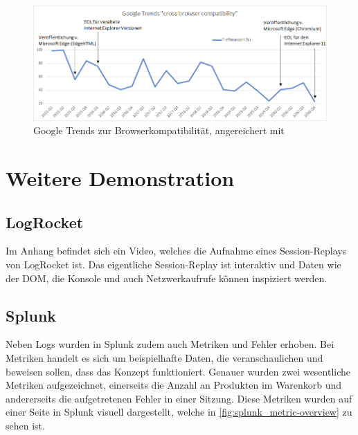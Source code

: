 \begin{figure}[H]
	\centering
	\includegraphics[width=0.84\linewidth]{img/99_postscript/google-trends_cross-browser-compatability.png}
	\caption{Google Trends zur Browserkompatibilität, angereichert mit \cite{MicrosoftIEandEdgeLifecycleFAQ}}
	\label{fig:google-search-trends_cross-browser-compatability}
\end{figure}

\section{Weitere Demonstration}
\label{sec:weitere-demonstration}

\subsection{LogRocket}
\label{sec:demo-logrocket}

Im Anhang befindet sich ein Video, welches die Aufnahme eines Session-Replays von LogRocket ist. Das eigentliche Session-Replay ist interaktiv und Daten wie der DOM, die Konsole und auch Netzwerkaufrufe können inspiziert werden.

\subsection{Splunk}
\label{sec:demo-splunk}

Neben Logs wurden in Splunk zudem auch Metriken und Fehler erhoben. Bei Metriken handelt es sich um beispielhafte Daten, die veranschaulichen und beweisen sollen, dass das Konzept funktioniert. Genauer wurden zwei wesentliche Metriken aufgezeichnet, einerseits die Anzahl an Produkten im Warenkorb und andererseits die aufgetretenen Fehler in einer Sitzung. Diese Metriken wurden auf einer Seite in Splunk visuell dargestellt, welche in \autoref{fig:splunk_metric-overview} zu sehen ist.

